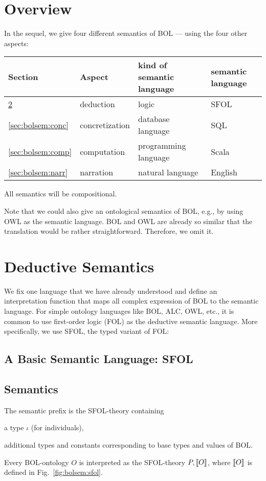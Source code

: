 \section{Overview}

In the sequel, we give four different semantics of BOL --- using the four other aspects:
\begin{center}
\begin{tabular}{llll}
Section & Aspect & kind of semantic language & semantic language\\
\hline
\ref{sec:bolsem:ded} & deduction & logic & SFOL \\
\ref{sec:bolsem:conc} & concretization & database language & SQL \\
\ref{sec:bolsem:comp} & computation & programming language & Scala \\
\ref{sec:bolsem:narr} & narration & natural language & English \\
\end{tabular}
\end{center}

All semantics will be compositional.

Note that we could also give an ontological semantics of BOL, e.g., by using OWL as the semantic language.
BOL and OWL are already so similar that the translation would be rather straightforward.
Therefore, we omit it.

\section{Deductive Semantics}\label{sec:bolsem:ded}

We fix one language that we have already understood and define an interpretation function that maps all complex expression of BOL to the semantic language.
For simple ontology languages like BOL, ALC, OWL, etc., it is common to use first-order logic (FOL) as the deductive semantic language.
More specifically, we use SFOL, the typed variant of FOL:

\subsection{A Basic Semantic Language: SFOL}\label{sec:wuv:tfol}
  

\subsection{Semantics}

\begin{definition}\label{def:bolsem:sfol}
The semantic prefix is the SFOL-theory containing
\begin{compactitem}
 \item a type $\iota$ (for individuals),
 \item additional types and constants corresponding to base types and values of BOL.
\end{compactitem}

Every BOL-ontology $O$ is interpreted as the SFOL-theory $P,\llbracket O\rrbracket$, where $\llbracket O\rrbracket$ is defined in Fig.~\ref{fig:bolsem:sfol}.
\end{definition}

